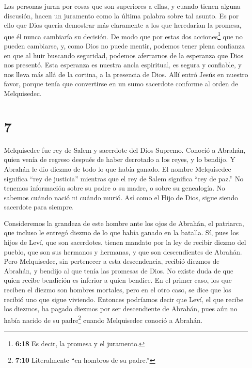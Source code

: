  Las personas juran por cosas que son superiores a ellas, y
cuando tienen alguna discusión, hacen un juramento como la última
palabra sobre tal asunto.  Es por ello que Dios quería
demostrar más claramente a los que heredarían la promesa, que él nunca
cambiaría su decisión.  De modo que por estas dos
acciones\footnote{\textbf{6:18} Es decir, la promesa y el juramento.}
que no pueden cambiarse, y, como Dios no puede mentir, podemos tener
plena confianza en que al huir buscando seguridad, podemos aferrarnos de
la esperanza que Dios nos presentó.  Esta esperanza es
nuestra ancla espiritual, es segura y confiable, y nos lleva más allá de
la cortina, a la presencia de Dios.  Allí entró Jesús en
nuestro favor, porque tenía que convertirse en un sumo sacerdote
conforme al orden de Melquisedec.

\hypertarget{section-6}{%
\section{7}\label{section-6}}

 Melquisedec fue rey de Salem y sacerdote del Dios Supremo.
Conoció a Abrahán, quien venía de regreso después de haber derrotado a
los reyes, y lo bendijo.  Y Abrahán le dio diezmo de todo lo
que había ganado. El nombre Melquisedec significa ``rey de justicia''
mientras que el rey de Salem significa ``rey de paz.''  No
tenemos información sobre su padre o su madre, o sobre su genealogía. No
sabemos cuándo nació ni cuándo murió. Así como el Hijo de Dios, sigue
siendo sacerdote para siempre.

 Consideremos la grandeza de este hombre ante los ojos de
Abrahán, el patriarca, que incluso le entregó diezmo de lo que había
ganado en la batalla.  Sí, pues los hijos de Leví, que son
sacerdotes, tienen mandato por la ley de recibir diezmo del pueblo, que
son sus hermanos y hermanas, y que son descendientes de Abrahán.
 Pero Melquisedec, sin pertenecer a esta descendencia,
recibió diezmos de Abrahán, y bendijo al que tenía las promesas de Dios.
 No existe duda de que quien recibe bendición es inferior a
quien bendice.  En el primer caso, los que reciben el diezmo
son hombres mortales, pero en el otro caso, se dice que los recibió uno
que sigue viviendo.  Entonces podríamos decir que Leví, el
que recibe los diezmos, ha pagado diezmos por ser descendiente de
Abrahán,  pues aún no había nacido de su padre\footnote{\textbf{7:10}
  Literalmente ``en hombros de su padre.''} cuando Melquisedec conoció a
Abrahán.

